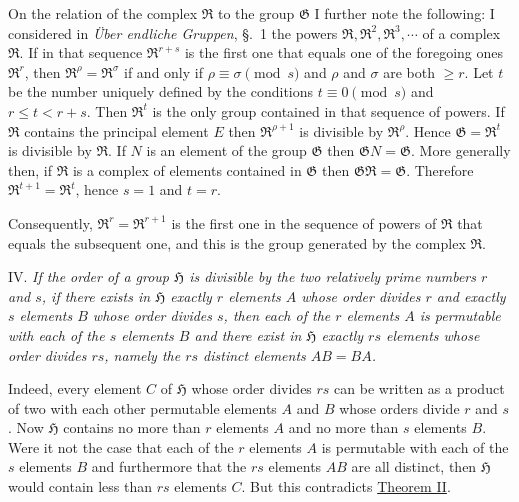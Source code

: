 \documentclass[a5paper,12pt]{article}
\newcommand{\secformat}[1]{\centering{\normalfont\normalsize{#1}}}
\let\fr\mathfrak
\newcommand{\CG}{\fr{G}}
\newcommand{\CH}{\fr{H}}
\newcommand{\CR}{\fr{R}}
\newcommand{\?}{{\color{blue}${}^{(?)}$}}
\newcounter{origpagecounter}{}
\newcommand{\origpagebreak}{\mark{\arabic{origpagecounter}}\addtocounter{origpagecounter}{1}\mark{\arabic{origpagecounter}}}
\begin{document}

On the relation of the complex $\CR$ to the group $\CG$
I further note the following:
%
%
I considered 
in \emph{\"Uber endliche Gruppen}, \S.~1
the powers $\CR, \CR^2, \CR^3, \cdots$ of a complex $\CR$.
%
%
If in that sequence 
$\CR^{r + s}$ 
is the first one
that equals one of the foregoing ones $\CR^r$,
then
$\CR^\rho = \CR^\sigma$
if and only if
$\rho \equiv \sigma \pmod{s}$
and
$\rho$ and $\sigma$ are both $\geq r$.
%
%
Let $t$ be the number uniquely defined by 
the conditions
$t \equiv 0 \pmod{s}$
and
$r \leq t < r + s$.
%
%
Then $\CR^t$ is the only group contained in that sequence
of powers.
%
%
If $\CR$ contains the principal element $E$
then $\CR^{\rho + 1}$ is divisible by $\CR^\rho$.
%
%
Hence $\CG = \CR^t$ is divisible by $\CR$.
%
%
If $N$ is an element of the group $\CG$
then $\CG N = \CG$.
%
%
More generally then,
if $\CR$
is a complex of elements 
contained in $\CG$
then $\CG \CR = \CG$.
%
%
Therefore $\CR^{t+1} = \CR^t$,
hence $s = 1$ and $t = r$.
%
%
\origpagebreak
%
%
Consequently,
$\CR^r = \CR^{r+1}$
is the first one
in the sequence of powers of $\CR$
that equals the subsequent one,
and this is the group generated by the complex $\CR$.


IV.
%
\label{t:2-4}
%
\emph{ %
If the order of a group $\CH$ 
is 
divisible by the two relatively prime numbers $r$ and $s$,
if
there exists in $\CH$ 
exactly $r$ elements $A$
whose order divides $r$
and
exactly $s$ elements $B$
whose order divides $s$,
then
each of the $r$ elements $A$
is permutable
with each of the $s$ elements $B$
and
there exist in $\CH$ exactly $r s$ elements
whose order divides $r s$,
namely the $r s$ distinct elements $A B = B A$.
}


Indeed,
every element $C$ of $\CH$
whose order divides $r s$
can be written as a product of 
two with each other permutable elements $A$ and $B$
whose orders divide $r$ and $s$.
%
%
Now
$\CH$ contains 
no more than $r$ elements $A$
and
no more than $s$ elements $B$.
%
%
Were it not the case
that
each of the $r$ elements $A$ 
is permutable with 
each of the $s$ elements $B$
and
furthermore
that
the $r s$ elements $A B$ are all distinct,
then
$\CH$ would contain less than $r s$ elements $C$.
%
%
But this contradicts
\hyperref[t:2-2]{Theorem II}.


\subsubsection*{\secformat{\S.~3.}}
\end{document}
